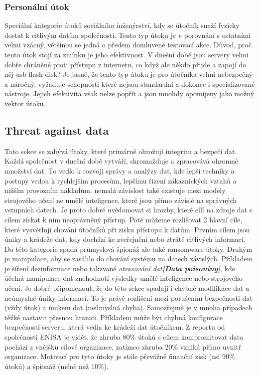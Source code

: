 \subsubsection{Personální útok}
Speciální kategorie útoků sociálního inženýrství, kdy se útočník snaží fyzicky dostat k citlivým datům společnosti.
Tento typ útoku je v porovnání s ostatními velmi vzácný, většinou se jedná o předem domluvené testovací akce.
Důvod, proč tento útok stojí za zmínku je jeho efektivnost.
V dnešní době jsou servery velmi dobře chráněné proti přístupu z internetu, co když ale někdo přijde a zapojí do něj usb flash disk?
Je jasné, že tento typ útoku je pro útočníka velmi nebezpečný a náročný, vyžaduje schopnosti které nejsou standardní a dokonce i specializované nástroje.
Jejich efektivita však nelze popřít a jsou mnohdy opomíjeny jako možný vektor útoku.\cite{moje_bakalarka}


\subsection{Threat against data}\label{subsec:threat-against-data}
Tato sekce se zabývá útoky, které primárně ohrožují integritu a bezpečí dat.
Každá společnost v dnešní době vytváří, shromažďuje a zpracovává ohromné množství dat.
To vedlo k rozvoji správy a analýzy dat, kde lepší techniky a postupy vedou k rychlejším procesům, lepšímu řízení zákaznických vztahů a nižším provozním nákladům.
nemalá závislost také existuje mezi modely strojového učení ne umělé inteligence, které jsou přímo závislé na správných vstupních datech.
Je proto dobré uvědomovat si hrozby, které cílí na zdroje dat s cílem získat k nim neoprávněný přístup.
Poté můžeme rozlišovat 2 hlavní cíle, které vysvětlují chování útočníků při zisku přístupu k datům.
Prvním cílem jsou úniky a krádeže dat, kdy dochází ke zveřejnění nebo ztrátě citlivých informací.
Do této kategorie spadá průmyslová špionáž ale také ransomware útoky.
Druhým je manipulace, aby se zasáhlo do chování systému na datech závislých.
Příkladem je šíření dezinformace nebo takzvané \textit{otravování dat\textbf{[Data poisoning]}}, kde účelná manipulace dat znehodnotí výsledky umělé inteligence nebo strojového učení.
Je dobré připomenout, že do této sekce spadají i chybné modifikace dat a neúmyslné úniky informací.
To je právě rozlišení mezi porušením bezpečnosti dat (vždy útok) a únikem dat (neúmyslná chyba).
Samozřejmě je v mnoha případech těžké nastavit přesnou hranici.
Příkladem může být chybná konfigurace bezpečnosti serveru, která vedla ke krádeži dat útočníkem.
Z reportu od společnosti \ac{ENISA} je vidět, že zhruba 80\% útoků s cílem kompromitovat data pochází z vnějšku cílové organizace, zatímco zhruba 20\% vzniká přímo uvnitř organizace.
Motivací pro tyto útoky je stále převážně finanční zisk (asi 90\% útoků) a špionáž (méně než 10\%).\cite{Enisa_thread_landscape}

